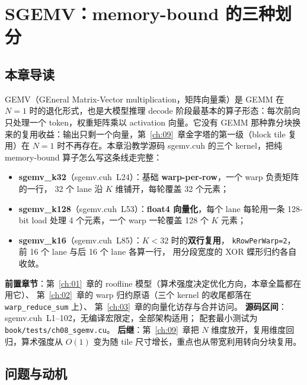 \chapter{SGEMV：memory-bound 的三种划分}\label{ch:08}

\section{本章导读}

GEMV（GEneral Matrix-Vector multiplication，矩阵向量乘）是 GEMM 在 $N = 1$ 时的退化形式，也是大模型推理 decode 阶段最基本的算子形态：每次前向只处理一个 token，权重矩阵乘以 activation 向量。它没有 GEMM 那种靠分块换来的复用收益：输出只剩一个向量，第~\ref{ch:09}~章金字塔的第一级（block tile 复用）在 $N=1$ 时不再存在。本章沿教学源码 sgemv.cuh 的三个 kernel，把纯 memory-bound 算子怎么写这条线走完整：

\begin{itemize}
  \item \textbf{sgemv\_k32}（sgemv.cuh~L24）：基础 \textbf{warp-per-row}，一个 warp 负责矩阵的一行，
        32 个 lane 沿 $K$ 维铺开，每轮覆盖 32 个元素；
  \item \textbf{sgemv\_k128}（sgemv.cuh~L53）：\textbf{float4 向量化}，每个 lane 每轮用一条
        128-bit load 处理 4 个元素，一个 warp 一轮覆盖 128 个 $K$ 元素；
  \item \textbf{sgemv\_k16}（sgemv.cuh~L85）：$K < 32$ 时的\textbf{双行复用}，
        \texttt{k\allowbreak{}Row\allowbreak{}Per\allowbreak{}Warp=\allowbreak{}2}，前 16 个 lane 与后 16 个 lane 各算一行，
        用分段宽度的 XOR 蝶形归约各自收敛。
\end{itemize}

\textbf{前置章节}：第~\ref{ch:01}~章的 roofline 模型（算术强度决定优化方向，本章全篇都在用它）、
第~\ref{ch:02}~章的 warp 归约原语（三个 kernel 的收尾都落在 \texttt{warp\_\allowbreak{}reduce\_\allowbreak{}sum} 上）、
第~\ref{ch:03}~章的向量化访存与合并访问。
\textbf{源码区间}：sgemv.cuh~L1--102，无编译宏限定，全部架构适用；
配套最小测试为 \texttt{book/\allowbreak{}tests/\allowbreak{}ch08\_\allowbreak{}sgemv.\allowbreak{}cu}。
\textbf{后继}：第~\ref{ch:09}~章把 $N$ 维度放开，复用维度回归，算术强度从 $O(1)$
变为随 tile 尺寸增长，重点也从带宽利用转向分块复用。

\section{问题与动机}

